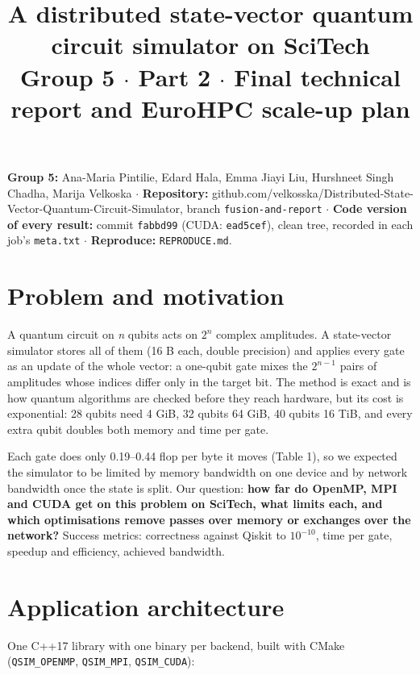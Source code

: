 \documentclass[10pt,a4paper]{article}
\title{\vspace{-12mm}A distributed state-vector quantum circuit simulator on SciTech\\[2pt]\large Group 5 $\cdot$ Part 2 $\cdot$ Final technical report and EuroHPC scale-up plan}
\date{}
\begin{document}
\maketitle
\vspace{-12mm}


\textbf{Group 5:} Ana-Maria Pintilie, Edard Hala, Emma Jiayi Liu, Hurshneet Singh Chadha, Marija Velkoska $\cdot$ \textbf{Repository:} github.com/velkosska/Distributed-State-Vector-Quantum-Circuit-Simulator, branch \texttt{fusion-and-report} $\cdot$ \textbf{Code version of every result:} commit \texttt{fabbd99} (CUDA: \texttt{ead5cef}), clean tree, recorded in each job's \texttt{meta.txt} $\cdot$ \textbf{Reproduce:} \texttt{REPRODUCE.md}.



\section{Problem and motivation}



A quantum circuit on \emph{n} qubits acts on $2^{n}$ complex amplitudes. A state-vector simulator stores all of them (16 B each, double precision) and applies every gate as an update of the whole vector: a one-qubit gate mixes the $2^{n-1}$ pairs of amplitudes whose indices differ only in the target bit. The method is exact and is how quantum algorithms are checked before they reach hardware, but its cost is exponential: 28 qubits need 4 GiB, 32 qubits 64 GiB, 40 qubits 16 TiB, and every extra qubit doubles both memory and time per gate.



Each gate does only 0.19--0.44 flop per byte it moves (Table 1), so we expected the simulator to be limited by memory bandwidth on one device and by network bandwidth once the state is split. Our question: \textbf{how far do OpenMP, MPI and CUDA get on this problem on SciTech, what limits each, and which optimisations remove passes over memory or exchanges over the network?} Success metrics: correctness against Qiskit to $10^{-10}$, time per gate, speedup and efficiency, achieved bandwidth.



\section{Application architecture}



One C++17 library with one binary per backend, built with CMake (\texttt{QSIM\_OPENMP}, \texttt{QSIM\_MPI}, \texttt{QSIM\_CUDA}):
\end{document}
